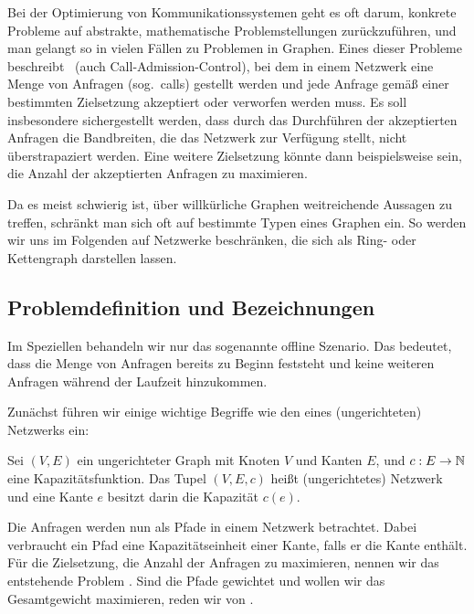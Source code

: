 Bei der Optimierung von Kommunikationssystemen geht es oft darum, konkrete Probleme auf abstrakte, mathematische 
Problemstellungen zurückzuführen, und man gelangt so in vielen Fällen zu Problemen in Graphen.
Eines dieser Probleme beschreibt \CallControl\ (auch Call-Admission-Control), bei dem
in einem Netzwerk eine Menge von Anfragen (sog.\ calls) gestellt werden und jede Anfrage gemäß einer bestimmten Zielsetzung
akzeptiert oder verworfen werden muss.
Es soll insbesondere sichergestellt werden, dass durch das Durchführen der akzeptierten Anfragen die Bandbreiten,
die das Netzwerk zur Verfügung stellt, nicht überstrapaziert werden.
Eine weitere Zielsetzung könnte dann beispielsweise sein, die Anzahl der akzeptierten Anfragen zu maximieren.

Da es meist schwierig ist, über willkürliche Graphen weitreichende Aussagen zu treffen, schränkt
man sich oft auf bestimmte Typen eines Graphen ein.
So werden wir uns im Folgenden auf Netzwerke beschränken, die sich als Ring- oder Kettengraph darstellen lassen.

\subsection{Problemdefinition und Bezeichnungen}
Im Speziellen behandeln wir nur das sogenannte offline Szenario.
Das bedeutet, dass die Menge von Anfragen bereits zu Beginn feststeht und keine weiteren Anfragen während der
Laufzeit hinzukommen.

Zunächst führen wir einige wichtige Begriffe wie den eines (ungerichteten) Netzwerks ein:

\begin{definition}[Netzwerk]
	Sei $(V,E)$ ein ungerichteter Graph mit Knoten $V$ und Kanten $E$, und $c: E \to \mathbb N$ eine Kapazitätsfunktion.
	Das Tupel $(V,E,c)$ heißt (ungerichtetes) Netzwerk und eine Kante $e$ besitzt darin die Kapazität $c(e)$.
\end{definition}

Die Anfragen werden nun als Pfade in einem Netzwerk betrachtet.
Dabei verbraucht ein Pfad eine Kapazitätseinheit einer Kante, falls er die Kante enthält.
Für die Zielsetzung, die Anzahl der Anfragen zu maximieren, nennen wir das entstehende Problem \CallControl.
Sind die Pfade gewichtet und wollen wir das Gesamtgewicht maximieren, reden wir von \WeightedCallControl.


